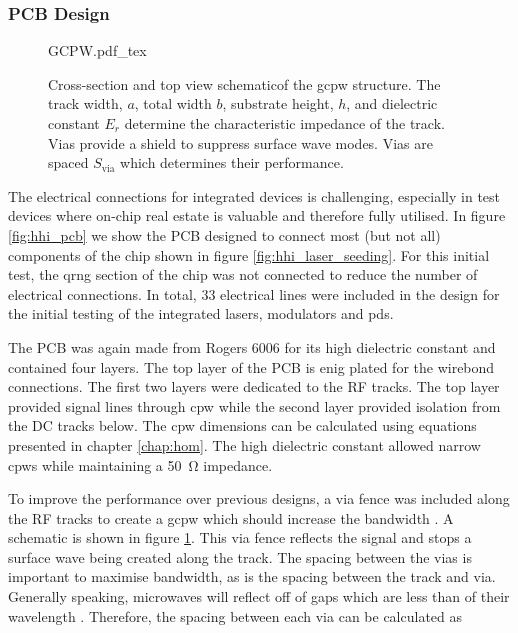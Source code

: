 
\subsubsection*{PCB Design}

\begin{figure}[t]
	\centering	
	\def\svgwidth{\textwidth} 
	{GCPW.pdf_tex}
	\caption[Grounded coplanar waveguide schematic]{Cross-section and top view schematicof the \acf{gcpw} structure. The track width, $a$, total width $b$, substrate height, $h$, and dielectric constant $E_r$ determine the characteristic impedance of the track. Vias provide a shield to suppress surface wave modes. Vias are spaced $S_\text{via}$ which determines their performance.}
	\label{fig:gcpw}
\end{figure}

The electrical connections for integrated devices is challenging, especially in test devices where on-chip real estate is valuable and therefore fully utilised. In figure \ref{fig:hhi_pcb} we show the PCB designed to connect most (but not all) components of the chip shown in figure \ref{fig:hhi_laser_seeding}. For this initial test, the \ac{qrng} section of the chip was not connected to reduce the number of electrical connections. In total, 33 electrical lines were included in the design for the initial testing of the integrated lasers, modulators and \acp{pd}.

The PCB was again made from Rogers 6006 for its high dielectric constant and contained four layers. The top layer of the PCB is \ac{enig} plated for the wirebond connections. The first two layers were dedicated to the RF tracks. The top layer provided signal lines through \ac{cpw} while the second layer provided isolation from the DC tracks below. The \ac{cpw} dimensions can be calculated using equations presented in chapter \ref{chap:hom}. The high dielectric constant allowed narrow \acp{cpw} while maintaining a \SI{50}{\ohm} impedance. 

To improve the performance over previous designs, a via fence was included along the RF tracks to create a \ac{gcpw} which should increase the bandwidth \cite{haydl2002use}. A schematic is shown in figure \ref{fig:gcpw}. This via fence reflects the signal and stops a surface wave being created along the track. The spacing between the vias is important to maximise bandwidth, as is the spacing between the track and via. Generally speaking, microwaves will reflect off of gaps which are less than  of their wavelength \cite{Sain2016}. Therefore, the spacing between each via can be calculated as 

